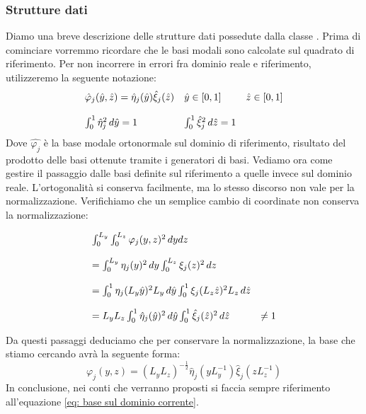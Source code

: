 \subsubsection{Strutture dati}
Diamo una breve descrizione delle strutture dati possedute dalla classe . Prima di cominciare vorremmo 
ricordare che le basi modali sono calcolate sul quadrato di riferimento. Per non incorrere in errori fra dominio reale e riferimento,  
utilizzeremo la seguente notazione:
\begin{equation}
\label{eq: notazione}
\begin{array}{l l l}
\hat{\varphi}_j(\hat{y},\hat{z}) = \hat{\eta}_j(\hat{y}) \hat{\xi}_j(\hat{z}) & \hat{y} \in [0,1] & \hat{z} \in [0,1] 
\\
\\
\int_0^1 \hat{\eta}^2_j\,d\hat{y} = 1 & \int_0^1 \hat{\xi}^2_j\,d\hat{z} = 1
\end{array}
\end{equation}
Dove $\hat{\varphi_j}$ \`e la base modale ortonormale sul dominio di riferimento, risultato del prodotto delle basi ottenute tramite i 
generatori di basi.
Vediamo ora come gestire il passaggio dalle basi definite sul riferimento a quelle invece sul dominio reale. L'ortogonalit\`a si conserva 
facilmente, ma lo stesso discorso non vale per la normalizzazione. Verifichiamo che un semplice cambio di coordinate non conserva la 
normalizzazione:

\begin{equation}
\label{eq: trasformazione}
\begin{array}{l l }
\int_0^{L_y}\int_0^{L_z} \varphi_j(y,z)^2 \,dydz 
\\
\\
= \int_0^{L_y} \eta_j(y)^2 \,dy\int_0^{L_z} \xi_j(z)^2 \,dz 
\\
\\
= \int_0^{1} \eta_j(L_y\hat{y})^2 L_y\,d\hat{y} \int_0^{1} \xi_j(L_z\hat{z})^2 L_z\,d\hat{z} 
\\
\\
 = L_yL_z\int_0^{1} \hat{\eta}_j(\hat{y})^2 \,d\hat{y} \int_0^{1} \hat{\xi}_j(\hat{z})^2 \,d\hat{z} & \neq  1  
\end{array}
\end{equation}

Da questi passaggi deduciamo che per conservare la normalizzazione, la base che stiamo cercando avr\`a la seguente forma:
\begin{equation}
\label{eq: base sul dominio corrente}
\varphi_j(y,z) = (L_yL_z)^{-\frac{1}{2}}\hat{\eta}_j(yL_y^{-1})\hat{\xi}_j(zL_z^{-1})
\end{equation}
In conclusione, nei conti che verranno proposti si faccia sempre riferimento all'equazione \eqref{eq: base sul dominio corrente}.

